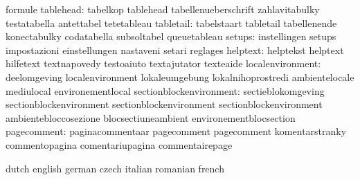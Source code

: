                            formule
                tablehead: tabelkop                  tablehead
                           tabellenueberschrift      zahlavitabulky
                           testatabella              antettabel
                           tetetableau
                tabletail: tabelstaart               tabletail
                           tabellenende              konectabulky
                           codatabella               subsoltabel
                           queuetableau
                   setups: instellingen              setups
                           impostazioni              einstellungen
                           nastaveni                 setari
                           reglages
                 helptext: helptekst                 helptext
                           hilfetext                 textnapovedy
                           testoaiuto                textajutator
                           texteaide
         localenvironment: deelomgeving              localenvironment
                           lokaleumgebung            lokalnihoprostredi
                           ambientelocale            mediulocal
                           environementlocal
  sectionblockenvironment: sectieblokomgeving        sectionblockenvironment
                           sectionblockenvironment   sectionblockenvironment
                           ambientebloccosezione     blocsectiuneambient
                           environementblocsection
              pagecomment: paginacommentaar          pagecomment
                           pagecomment               komentarstranky
                           commentopagina            comentariupagina
                           commentairepage

\stopvariables




\startvariables            dutch                     english
                           german                    czech
                           italian                   romanian
                           french


